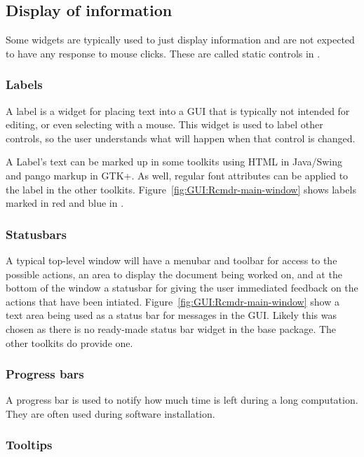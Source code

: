 \subsection{Display of information}
\label{sec:GUI:info-display}

Some widgets are typically used to just display information and are
not expected to have any response to mouse clicks. These are called
static controls in \wxWidgets. 

\subsubsection{Labels}
\label{sec:GUI:labels}
A label is a widget for placing text into a GUI that is typically not
intended for editing, or even selecting with a mouse. This widget is
used to label other controls, so the user understands what will happen
when that control is changed.

A Label's text can be marked up in some toolkits using HTML in
Java/Swing and pango markup in GTK+. As well, regular font attributes
can be applied to the label in the other
toolkits. Figure~\ref{fig:GUI:Rcmdr-main-window} shows labels marked in
red and blue in .

\subsubsection{Statusbars}
\label{sec:GUI:statusbars}

A typical top-level window will have a menubar and toolbar for access
to the possible actions, an area to display the document being worked
on, and at the bottom of the window a statusbar for giving the user
immediated feedback on the actions that have been
intiated. Figure~\ref{fig:GUI:Rcmdr-main-window} show a text area being
used as a status bar for messages in the  GUI. Likely this
was chosen as there is no ready-made status bar widget in the base
 package. The other toolkits do provide one.

\subsubsection{Progress bars}

A progress bar is used to notify how much time is left during a long
computation. They are often used during software installation. 


\subsubsection{Tooltips}
\label{sec:GUI:basic-tooltips}

